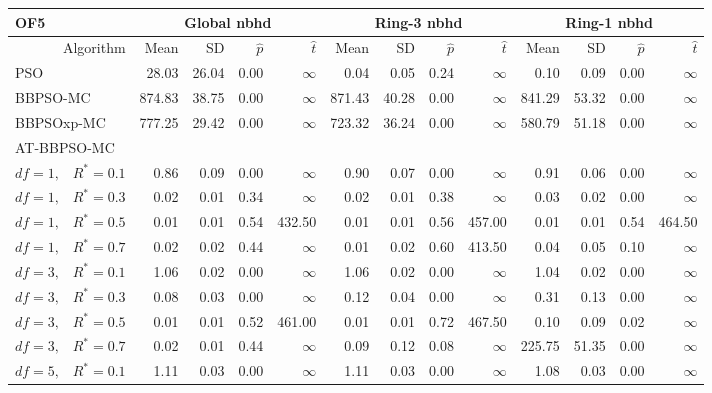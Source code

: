 \documentclass[12pt]{article}
\begin{document}
\begin{table}[ht]
\centering
\tiny{
\begin{tabular}{r|rrrr|rrrr|rrrr}
\multicolumn{1}{l}{OF5} & \multicolumn{4}{c}{Global nbhd} & \multicolumn{4}{c}{Ring-3 nbhd} & \multicolumn{4}{c}{Ring-1 nbhd}\\
  \hline
Algorithm & Mean & SD & $\widehat{p}$ & $\widehat{t}$ & Mean & SD & $\widehat{p}$ & $\widehat{t}$ & Mean & SD & $\widehat{p}$ & $\widehat{t}$ \\ 
  \hline
\multicolumn{1}{l|}{PSO} & 28.03 & 26.04 & 0.00 & $\infty$ & 0.04 & 0.05 & 0.24 & $\infty$ & 0.10 & 0.09 & 0.00 & $\infty$ \\ 
  \multicolumn{1}{l|}{BBPSO-MC} & 874.83 & 38.75 & 0.00 & $\infty$ & 871.43 & 40.28 & 0.00 & $\infty$ & 841.29 & 53.32 & 0.00 & $\infty$ \\ 
  \multicolumn{1}{l|}{BBPSOxp-MC} & 777.25 & 29.42 & 0.00 & $\infty$ & 723.32 & 36.24 & 0.00 & $\infty$ & 580.79 & 51.18 & 0.00 & $\infty$ \\ 
\hline
\multicolumn{1}{l|}{AT-BBPSO-MC} &&&&&&&&&&&&\\
  $df = 1,\enspace$ $R^* =0.1$ & 0.86 & 0.09 & 0.00 & $\infty$ & 0.90 & 0.07 & 0.00 & $\infty$ & 0.91 & 0.06 & 0.00 & $\infty$ \\ 
  $df = 1,\enspace$ $R^* =0.3$ & 0.02 & 0.01 & 0.34 & $\infty$ & 0.02 & 0.01 & 0.38 & $\infty$ & 0.03 & 0.02 & 0.00 & $\infty$ \\ 
  $df = 1,\enspace$ $R^* =0.5$ & 0.01 & 0.01 & 0.54 & 432.50 & 0.01 & 0.01 & 0.56 & 457.00 & 0.01 & 0.01 & 0.54 & 464.50 \\ 
  $df = 1,\enspace$ $R^* =0.7$ & 0.02 & 0.02 & 0.44 & $\infty$ & 0.01 & 0.02 & 0.60 & 413.50 & 0.04 & 0.05 & 0.10 & $\infty$ \\ 
  $df = 3,\enspace$ $R^* =0.1$ & 1.06 & 0.02 & 0.00 & $\infty$ & 1.06 & 0.02 & 0.00 & $\infty$ & 1.04 & 0.02 & 0.00 & $\infty$ \\ 
  $df = 3,\enspace$ $R^* =0.3$ & 0.08 & 0.03 & 0.00 & $\infty$ & 0.12 & 0.04 & 0.00 & $\infty$ & 0.31 & 0.13 & 0.00 & $\infty$ \\ 
  $df = 3,\enspace$ $R^* =0.5$ & 0.01 & 0.01 & 0.52 & 461.00 & 0.01 & 0.01 & 0.72 & 467.50 & 0.10 & 0.09 & 0.02 & $\infty$ \\ 
  $df = 3,\enspace$ $R^* =0.7$ & 0.02 & 0.01 & 0.44 & $\infty$ & 0.09 & 0.12 & 0.08 & $\infty$ & 225.75 & 51.35 & 0.00 & $\infty$ \\ 
  $df = 5,\enspace$ $R^* =0.1$ & 1.11 & 0.03 & 0.00 & $\infty$ & 1.11 & 0.03 & 0.00 & $\infty$ & 1.08 & 0.03 & 0.00 & $\infty$ \\ 

\end{tabular}}
\end{table}
\end{document}
